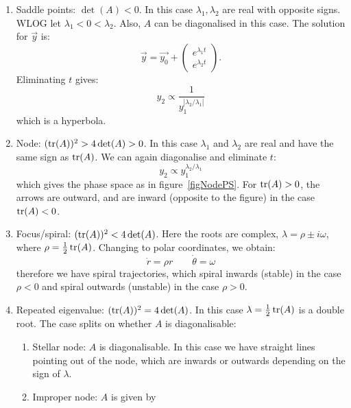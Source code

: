 \documentclass[../Main.tex]{subfiles}
\begin{document}
\begin{enumerate}
    \item Saddle points: $\det(A) < 0$. In this case $\lambda_1, \lambda_2$ are real with opposite signs. WLOG let $\lambda_1 < 0 < \lambda_2$. Also, $A$ can be diagonalised in this case. The solution for $\vec{y}$ is:
        \begin{equation*}
            \vec{y} = \vec{y_0} + \begin{pmatrix}e^{\lambda_1 t} \\ e^{\lambda_2 t}\end{pmatrix}.
        \end{equation*}
        Eliminating $t$ gives:
        \begin{equation*}
            y_2 \propto \frac{1}{y_1^{|\lambda_2 / \lambda_1|}}
        \end{equation*}
        which is a hyperbola.
    \item Node: $(\operatorname{tr}(A))^2 > 4 \det(A) > 0$. In this case $\lambda_1$ and $\lambda_2$ are real and have the same sign as $\operatorname{tr}(A)$. We can again diagonalise and eliminate $t$:
        \begin{equation*}
            y_2 \propto y_1^{\lambda_2 / \lambda_1}
        \end{equation*}
        which gives the phase space as in figure~\ref{figNodePS}. For $\operatorname{tr}(A) > 0$, the arrows are outward, and are inward (opposite to the figure) in the case $\operatorname{tr}(A) < 0$.
    \item Focus/spiral: $(\operatorname{tr}(A))^2 < 4\det(A)$. Here the roots are complex, $\lambda = \rho \pm i\omega$, where $\rho = \frac12 \operatorname{tr}(A)$. Changing to polar coordinates, we obtain:
        \begin{equation*}
            \dot{r} = \rho r\qquad\dot{\theta} = \omega
        \end{equation*}
        therefore we have spiral trajectories, which spiral inwards (stable) in the case $\rho < 0$ and spiral outwards (unstable) in the case $\rho > 0$.
    \item Repeated eigenvalue: $(\operatorname{tr}(A))^2 = 4\det(A)$. In this case $\lambda = \frac12 \operatorname{tr}(A)$ is a double root. The case splits on whether $A$ is diagonalisable:
        \begin{enumerate}
            \item Stellar node: $A$ is diagonalisable. In this case we have straight lines pointing out of the node, which are inwards or outwards depending on the sign of $\lambda$.
            \item Improper node: $A$ is given by

\end{enumerate}
\end{enumerate}
\end{document}

